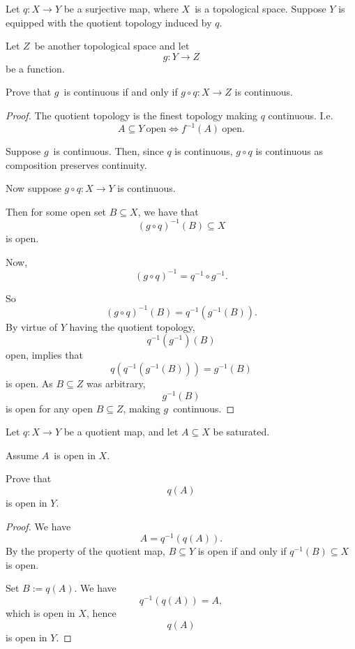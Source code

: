 \documentclass[11pt]{article}
\begin{document}
\begin{prob}
    Let $q : X \to Y$ be a surjective map, where 
    $X$ is a topological space. 
    Suppose $Y$ is equipped with 
    the quotient topology induced by $q$. 

    Let $Z$ be another topological space and let 
    \[
        g : Y \to Z
    \]
    be a function. 

    Prove that $g$ is continuous if and only if 
    $g \circ q : X \to Z$ is continuous. 
\end{prob}
\begin{proof}
    The quotient topology is the finest topology making 
    $q$ continuous. I.e. 
    \[
        A \subseteq Y \ \text{open} \Leftrightarrow 
        f^{-1}(A) \ \text{open}. 
    \]

    Suppose $g$ is continuous. 
    Then, since $q$ is continuous, 
    $g \circ q$ is continuous as composition 
    preserves continuity. 

    Now suppose $g \circ q : X \to Y$ is continuous. 

    Then for some open set $B \subseteq X$, 
    we have that 
    \[
        (g \circ q)^{-1}(B) \subseteq X  
    \]
    is open. 

    Now, 
    \[
        (g\circ q)^{-1} = q^{-1} \circ g^{-1}. 
    \]

    So 
    \[
        (g\circ q)^{-1}(B) = q^{-1}(g^{-1}(B)). 
    \]
    By virtue of $Y$ having the quotient topology, 
    \[
        q^{-1}(g^{-1})(B) 
    \]
    open, implies that 
    \[
        q(q^{-1}(g^{-1}(B))) = g^{-1}(B) 
    \]
    is open. 
    As $B \subseteq Z$ was arbitrary, 
    \[
        g^{-1}(B) 
    \]
    is open for any open $B \subseteq Z$, making 
    $g$ continuous. 
\end{proof}

\begin{prob}
    Let $q : X \to Y$ be a quotient map, and let 
    $A \subseteq X$ be saturated. 

    Assume $A$ is open in $X$. 

    Prove that 
    \[
        q(A) 
    \]
    is open in $Y$.
\end{prob}
\begin{proof}
    We have 
    \[
        A = q^{-1}(q(A)). 
    \]
    By the property of the quotient map, 
    $B \subseteq Y$ is open if and only if 
    $q^{-1}(B) \subseteq X$ is open. 

    Set $B := q(A)$. 
    We have 
    \[
        q^{-1}(q(A)) = A, 
    \]
    which is open in $X$, 
    hence 
    \[
        q(A) 
    \]
    is open in $Y$.
\end{proof}
\end{document}

